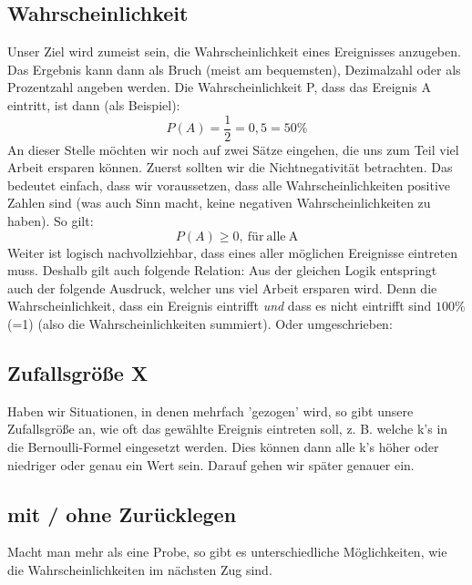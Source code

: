 	\subsection{Wahrscheinlichkeit}
		Unser Ziel wird zumeist sein, die Wahrscheinlichkeit eines Ereignisses
		anzugeben. Das Ergebnis kann dann als Bruch (meist am bequemsten), Dezimalzahl
		oder als Prozentzahl angeben werden. Die Wahrscheinlichkeit P, dass das
		Ereignis A eintritt, ist dann (als Beispiel):
		\[P(A)=\frac{1}{2}=0,5=50\%\]
		An dieser Stelle möchten wir noch auf zwei Sätze eingehen, die uns zum Teil
		viel Arbeit ersparen können. Zuerst sollten wir die Nichtnegativität
		betrachten. Das bedeutet einfach, dass wir voraussetzen, dass alle
		Wahrscheinlichkeiten positive Zahlen sind (was auch Sinn macht, keine
		negativen Wahrscheinlichkeiten zu haben). So gilt:
		\[P(A)\geq 0 \mathrm{,\ für\ alle\ A}\]
		Weiter ist logisch nachvollziehbar, dass eines aller möglichen Ereignisse
		eintreten muss. Deshalb gilt auch folgende Relation:
		\formel{\[P(\Omega)=P(A_1)+P(A_2)+ \ldots+ P(A_n)=1\]}
		Aus der gleichen Logik entspringt auch der folgende Ausdruck, welcher uns viel
		Arbeit ersparen wird. Denn die Wahrscheinlichkeit, dass ein Ereignis eintrifft
		\emph{und} dass es nicht eintrifft sind \(100\%\)(=1) (also die
		Wahrscheinlichkeiten summiert). Oder umgeschrieben:
		\formel{\[P(A)=1-P(\bar{A})\]}

	\subsection{Zufallsgröße X}
		Haben wir Situationen, in denen mehrfach 'gezogen' wird, so gibt unsere
		Zufallsgröße an, wie oft das gewählte Ereignis eintreten soll, z. B. welche
		k's in die Bernoulli-Formel eingesetzt werden. Dies können dann alle k's höher
		oder niedriger oder genau ein Wert sein. Darauf gehen wir später genauer ein.

	\subsection{mit / ohne Zurücklegen}
		Macht man mehr als eine Probe, so gibt es unterschiedliche Möglichkeiten, wie
		die Wahrscheinlichkeiten im nächsten Zug sind.\\
		
